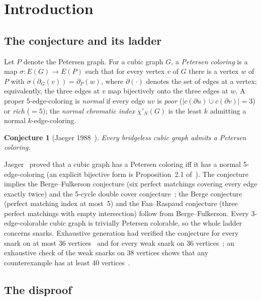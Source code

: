 \documentclass[11pt]{article}
\newtheorem{conjecture}[theorem]{Conjecture}
\theoremstyle{definition}
\theoremstyle{remark}
\newcommand{\PG}{P}
\begin{document}
\section{Introduction}

\subsection{The conjecture and its ladder}

Let $\PG$ denote the Petersen graph. For a cubic graph $G$, a \emph{Petersen coloring} is a map
$\sigma : E(G) \to E(\PG)$ such that for every vertex $v$ of $G$ there is a vertex $w$ of $\PG$
with $\sigma(\partial_G(v)) = \partial_\PG(w)$, where $\partial(\cdot)$ denotes the set of edges
at a vertex; equivalently, the three edges at $v$ map bijectively onto the three edges at $w$.
A proper 5-edge-coloring is \emph{normal} if every edge $uv$ is \emph{poor}
($|c(\partial u) \cup c(\partial v)| = 3$) or \emph{rich} ($= 5$); the \emph{normal chromatic
index} $\chi'_N(G)$ is the least $k$ admitting a normal $k$-edge-coloring.

\begin{conjecture}[Jaeger 1988~\cite{Jaeger1988}]
Every bridgeless cubic graph admits a Petersen coloring.
\end{conjecture}

Jaeger~\cite{Jaeger1985} proved that a cubic graph has a Petersen coloring iff it has a normal
5-edge-coloring (an explicit bijective form is Proposition~2.1 of~\cite{Putman2026}). The
conjecture implies the Berge--Fulkerson conjecture (six perfect matchings covering every edge
exactly twice) and the 5-cycle double cover conjecture~\cite{Jooken2026, MazzMkrt2020}; the
Berge conjecture (perfect matching index at most~5) and the Fan--Raspaud conjecture (three
perfect matchings with empty intersection) follow from Berge--Fulkerson. Every 3-edge-colorable
cubic graph is trivially Petersen colorable, so the whole ladder concerns snarks. Exhaustive
generation had verified the conjecture for every snark on at most 36 vertices~\cite{BGHM2013} and
for every weak snark on 36 vertices~\cite{GMS2019}; an exhaustive check of the weak snarks on 38
vertices shows that any counterexample has at least 40 vertices~\cite{GJMMMU2026}.

\subsection{The disproof}
\end{document}
